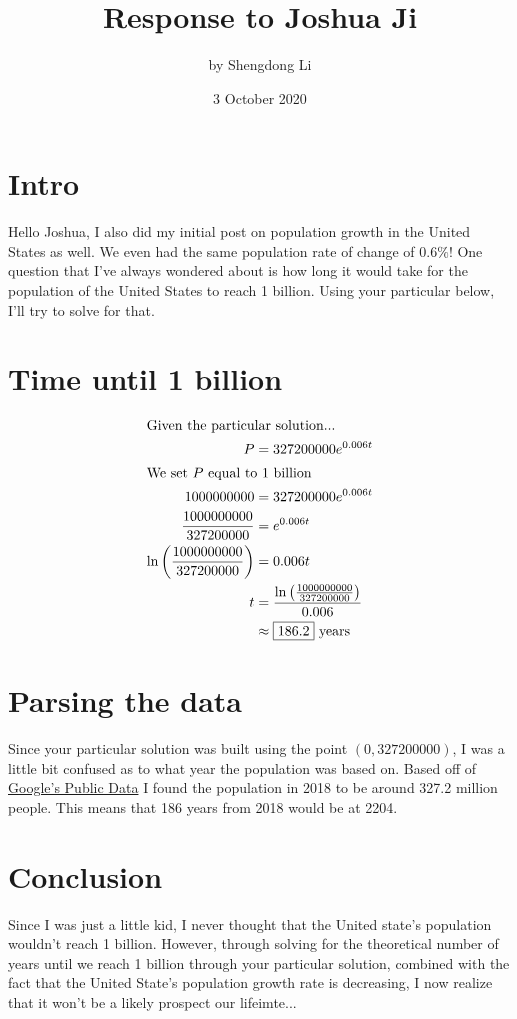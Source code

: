 \documentclass[12pt]{article}
\begin{document}
\title{Response to Joshua Ji}
\author{by Shengdong Li}
\date{3 October 2020}
\maketitle

\section{Intro}

Hello Joshua,
I also did my initial post on population growth in the United States as well. We even had the same population rate of change of $0.6\%$! One question that I've always wondered about is how long it would take for the population of the United States to reach 1 billion. Using your particular below, I'll try to solve for that.

\section{Time until 1 billion}

\begin{align}
  \intertext{Given the particular solution...}
  P                                            & =327200000e^{0.006t}                                        \\
  \intertext{We set $P$ equal to 1 billion}
  1000000000                                   & =327200000e^{0.006t}                                        \\
  \frac{1000000000}{327200000}                 & =e^{0.006t}                                                 \\
  \ln\left(\frac{1000000000}{327200000}\right) & =0.006t                                                     \\
  t                                            & =\frac{\ln\left(\frac{1000000000}{327200000}\right)}{0.006} \\
  &\approx\boxed{186.2}\text{ years}
\end{align}

\section{Parsing the data}
Since your particular solution was built using the point $(0, 327200000)$, I was a little bit confused as to what year the population was based on. Based off of \href{https://www.desmos.com/calculator/8abrp6yuwb}{Google's Public Data} I found the population in 2018 to be around 327.2 million people. This means that 186 years from 2018 would be at 2204.

\section{Conclusion}
Since I was just a little kid, I never thought that the United state's population wouldn't reach 1 billion. However, through solving for the theoretical number of years until we reach 1 billion through your particular solution, combined with the fact that the United State's population growth rate is decreasing, I now realize that it won't be a likely prospect our lifeimte...
\end{document}
